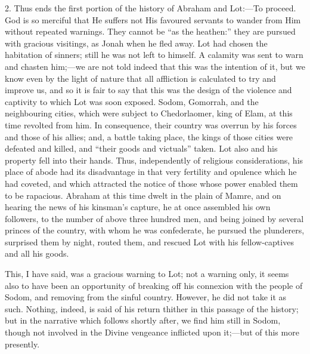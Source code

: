 2. Thus ends the first portion of the history of Abraham and Lot:—To
proceed. God is so merciful that He suffers not His favoured servants
to wander from Him without repeated warnings. They cannot be ``as
the heathen:'' they are pursued with gracious visitings, as Jonah
when he fled away. Lot had chosen the habitation of sinners; still he
was not left to himself. A calamity was sent to warn and chasten him;—we
are not told indeed that this was the intention of it, but we know
even by the light of nature that all affliction is calculated to try
and improve us, and so it is fair to say that this was the design of
the violence and captivity to which Lot was soon exposed. Sodom,
Gomorrah, and the neighbouring cities, which were subject to
Chedorlaomer, king of Elam, at this time revolted from him. In
consequence, their country was overrun by his forces and those of his
allies; and, a battle taking place, the kings of those cities were
defeated and killed, and ``their goods and victuals'' taken.
Lot also and his property fell into their hands. Thus, independently
of religious considerations, his place of abode had its disadvantage
in that very fertility and opulence which he had coveted, and which
attracted the notice of those whose power enabled them to be
rapacious. Abraham at this time dwelt in the plain of Mamre, and on
hearing the news of his kinsman's capture, he at once assembled his
own followers, to the number of above three hundred men, and being
joined by several princes of the country, with whom he was
confederate, he pursued the plunderers, surprised them by night,
routed them, and rescued Lot with his fellow-captives and all his
goods.

This, I have said, was a gracious warning to Lot; not a warning
only, it seems also to have been an opportunity of breaking off his
connexion with the people of Sodom, and removing from the sinful
country. However, he did not take it as such. Nothing, indeed, is said
of his return thither in this passage of the history; but in the
narrative which follows shortly after, we find him still in Sodom,
though not involved in the Divine vengeance inflicted upon it;—but
of this more presently.

